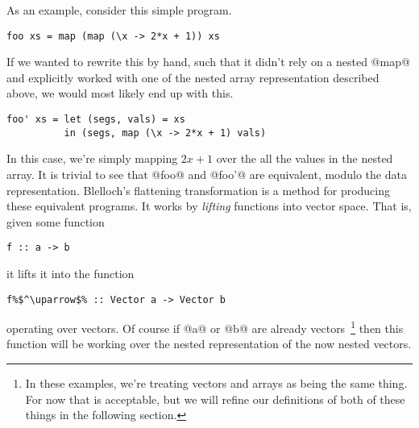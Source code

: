 As an example, consider this simple program.
%
\begin{lstlisting}
foo xs = map (map (\x -> 2*x + 1)) xs
\end{lstlisting}
%
If we wanted to rewrite this by hand, such that it didn't rely on a nested @map@ and explicitly worked with one of the nested array representation described above, we would most likely end up with this.
%
\begin{lstlisting}
foo' xs = let (segs, vals) = xs
          in (segs, map (\x -> 2*x + 1) vals)
\end{lstlisting}
%
In this case, we're simply mapping $2x+1$ over the all the values in the nested array. It is trivial to see that @foo@ and @foo'@ are equivalent, modulo the data representation. Blelloch's flattening transformation is a method for producing these equivalent programs. It works by \emph{lifting} functions into vector space. That is, given some function
%
\begin{lstlisting}
f :: a -> b
\end{lstlisting}
%
it lifts it into the function
%
\begin{lstlisting}
f%$^\uparrow$% :: Vector a -> Vector b
\end{lstlisting}
%
operating over vectors. Of course if @a@ or @b@ are already vectors~\footnote{In these examples, we're treating vectors and arrays as being the same thing. For now that is acceptable, but we will refine our definitions of both of these things in the following section.} then this function will be working over the nested representation of the now nested vectors.

